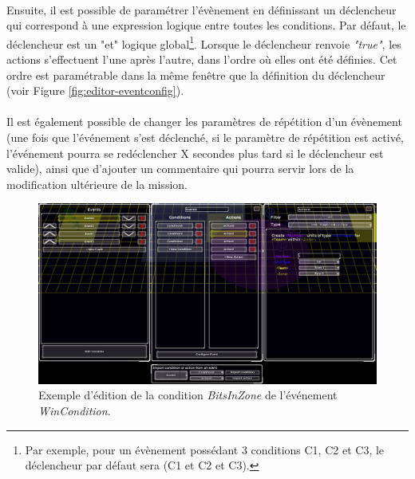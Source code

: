 \documentclass[a4paper]{article}
\begin{document}
\paragraph{ }
Ensuite, il est possible de paramétrer l'évènement en définissant un déclencheur qui correspond à une expression logique entre toutes les conditions. Par défaut, le déclencheur est un "et" logique global\footnote{Par exemple, pour un évènement possédant 3 conditions C1, C2 et C3, le déclencheur par défaut sera (C1 et C2 et C3).}. Lorsque le déclencheur renvoie \textit{"true"}, les actions s'effectuent l'une après l'autre, dans l'ordre où elles ont été définies. Cet ordre est paramétrable dans la même fenêtre que la définition du déclencheur (voir Figure \ref{fig:editor-eventconfig}).
\paragraph{ }
Il est également possible de changer les paramètres de répétition d'un évènement (une fois que l'événement s'est déclenché, si le paramètre de répétition est activé, l'événement pourra se redéclencher X secondes plus tard si le déclencheur est valide), ainsi que d'ajouter un commentaire qui pourra servir lors de la modification ultérieure de la mission.
\begin{figure}[H]
\centering
\includegraphics[width=\linewidth]{editor-trigger.png}
\caption{Exemple d'édition de la condition \textit{BitsInZone} de l'événement \textit{WinCondition}.}
\label{fig:editor-trigger}
\end{figure}
\end{document}
